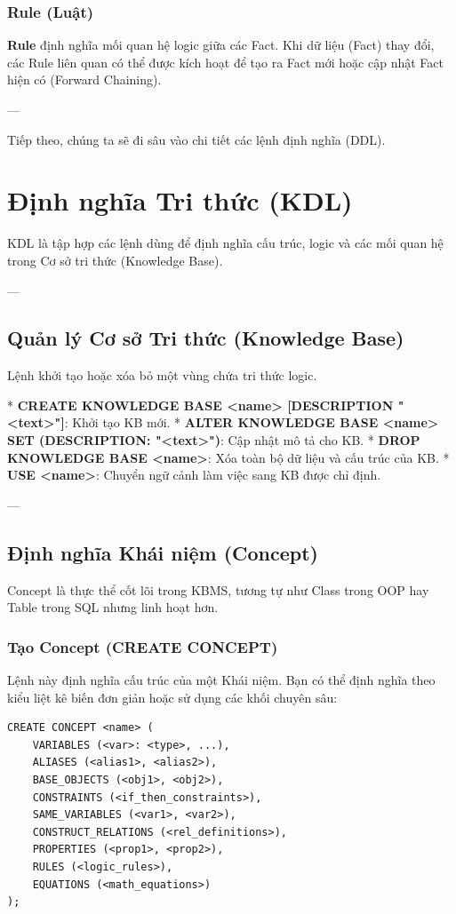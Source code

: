 \subsubsection{Rule (Luật)}
\textbf{Rule} định nghĩa mối quan hệ logic giữa các Fact. Khi dữ liệu (Fact) thay đổi, các Rule liên quan có thể được kích hoạt để tạo ra Fact mới hoặc cập nhật Fact hiện có (Forward Chaining).

---

Tiếp theo, chúng ta sẽ đi sâu vào chi tiết các lệnh định nghĩa (DDL).

\section{Định nghĩa Tri thức (KDL)}

KDL là tập hợp các lệnh dùng để định nghĩa cấu trúc, logic và các mối quan hệ trong Cơ sở tri thức (Knowledge Base). 

---

\subsection{Quản lý Cơ sở Tri thức (Knowledge Base)}

Lệnh khởi tạo hoặc xóa bỏ một vùng chứa tri thức logic.

*   \textbf{CREATE KNOWLEDGE BASE <name> [DESCRIPTION "<text>"]}: Khởi tạo KB mới.
*   \textbf{ALTER KNOWLEDGE BASE <name> SET (DESCRIPTION: "<text>")}: Cập nhật mô tả cho KB.
*   \textbf{DROP KNOWLEDGE BASE <name>}: Xóa toàn bộ dữ liệu và cấu trúc của KB.
*   \textbf{USE <name>}: Chuyển ngữ cảnh làm việc sang KB được chỉ định.

---

\subsection{Định nghĩa Khái niệm (Concept)}

Concept là thực thể cốt lõi trong KBMS, tương tự như Class trong OOP hay Table trong SQL nhưng linh hoạt hơn.

\subsubsection{Tạo Concept (CREATE CONCEPT)}
Lệnh này định nghĩa cấu trúc của một Khái niệm. Bạn có thể định nghĩa theo kiểu liệt kê biến đơn giản hoặc sử dụng các khối chuyên sâu:

\begin{verbatim}
CREATE CONCEPT <name> (
    VARIABLES (<var>: <type>, ...),
    ALIASES (<alias1>, <alias2>),
    BASE_OBJECTS (<obj1>, <obj2>),
    CONSTRAINTS (<if_then_constraints>),
    SAME_VARIABLES (<var1>, <var2>),
    CONSTRUCT_RELATIONS (<rel_definitions>),
    PROPERTIES (<prop1>, <prop2>),
    RULES (<logic_rules>),
    EQUATIONS (<math_equations>)
);
\end{verbatim}

